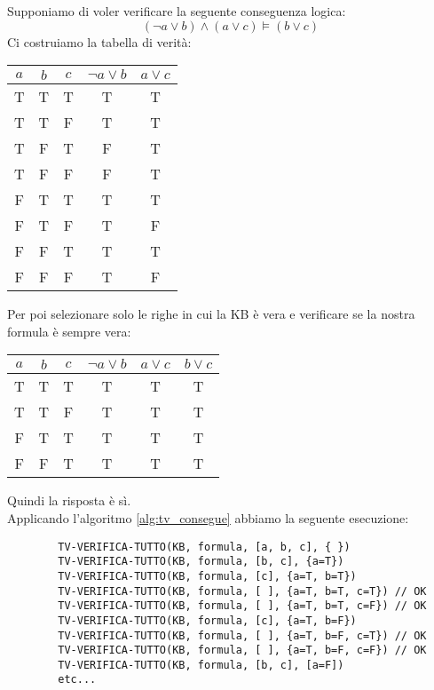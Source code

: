 \begin{example}
	Supponiamo di voler verificare la seguente conseguenza logica:
	\begin{equation*}
		(\neg a\lor b)\land(a \lor c) \models (b \lor c)
	\end{equation*}
	Ci costruiamo la tabella di verità:
	\begin{table}[!h]
		\centering
		\begin{tabular}{|ccc|cc|}
			\hline
			$a$&$b$&$c$&$\neg a \lor b$ & $a \lor c$ \\
			\hline
			T & T & T & T & T\\
			T & T& F & T & T \\
			T & F &T&F&T\\
			T&F&F&F&T\\
			F&T&T&T&T\\
			F&T&F&T&F\\
			F&F&T&T&T\\
			F&F&F&T&F\\
			\hline
		\end{tabular}
	\end{table}
	Per poi selezionare solo le righe in cui la KB è vera e verificare se la nostra formula è sempre vera:
	\begin{table}[!h]
		\centering
		\begin{tabular}{|ccc|cc|c|}
			\hline
			$a$&$b$&$c$&$\neg a \lor b$ & $a \lor c$ & $b\lor c$\\
			\hline
			T & T & T & T & T & T\\
			T & T& F & T & T & T\\
			F&T&T&T&T & T\\
			F&F&T&T&T&T\\
			\hline
		\end{tabular}
	\end{table}
	Quindi la risposta è sì.\\
	Applicando l'algoritmo \ref{alg:tv_consegue} abbiamo la seguente esecuzione:
	\begin{lstlisting}
		TV-VERIFICA-TUTTO(KB, formula, [a, b, c], { })
		TV-VERIFICA-TUTTO(KB, formula, [b, c], {a=T})
		TV-VERIFICA-TUTTO(KB, formula, [c], {a=T, b=T})
		TV-VERIFICA-TUTTO(KB, formula, [ ], {a=T, b=T, c=T}) // OK
		TV-VERIFICA-TUTTO(KB, formula, [ ], {a=T, b=T, c=F}) // OK
		TV-VERIFICA-TUTTO(KB, formula, [c], {a=T, b=F})
		TV-VERIFICA-TUTTO(KB, formula, [ ], {a=T, b=F, c=T}) // OK
		TV-VERIFICA-TUTTO(KB, formula, [ ], {a=T, b=F, c=F}) // OK
		TV-VERIFICA-TUTTO(KB, formula, [b, c], [a=F])
		etc...
	\end{lstlisting}
\end{example}
